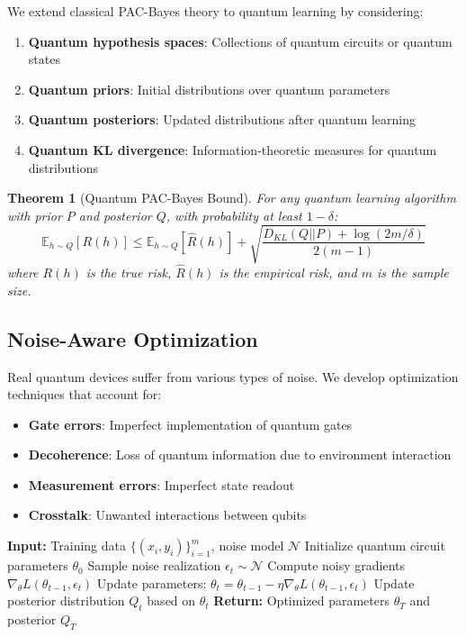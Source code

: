 \documentclass{article}
\newtheorem{theorem}{Theorem}
\begin{document}
We extend classical PAC-Bayes theory to quantum learning by considering:

\begin{enumerate}
\item \textbf{Quantum hypothesis spaces}: Collections of quantum circuits or quantum states
\item \textbf{Quantum priors}: Initial distributions over quantum parameters
\item \textbf{Quantum posteriors}: Updated distributions after quantum learning
\item \textbf{Quantum KL divergence}: Information-theoretic measures for quantum distributions
\end{enumerate}

\begin{theorem}[Quantum PAC-Bayes Bound]
For any quantum learning algorithm with prior $P$ and posterior $Q$, with probability at least $1-\delta$:
\begin{equation}
\mathbb{E}_{h \sim Q}[R(h)] \leq \mathbb{E}_{h \sim Q}[\hat{R}(h)] + \sqrt{\frac{D_{KL}(Q||P) + \log(2m/\delta)}{2(m-1)}}
\end{equation}
where $R(h)$ is the true risk, $\hat{R}(h)$ is the empirical risk, and $m$ is the sample size.
\end{theorem}

\subsection{Noise-Aware Optimization}

Real quantum devices suffer from various types of noise. We develop optimization techniques that account for:

\begin{itemize}
\item \textbf{Gate errors}: Imperfect implementation of quantum gates
\item \textbf{Decoherence}: Loss of quantum information due to environment interaction
\item \textbf{Measurement errors}: Imperfect state readout
\item \textbf{Crosstalk}: Unwanted interactions between qubits
\end{itemize}

\begin{algorithm}
\caption{Noise-Aware Quantum Optimization}
\begin{algorithmic}[1]
\State \textbf{Input:} Training data $\{(x_i, y_i)\}_{i=1}^m$, noise model $\mathcal{N}$
\State Initialize quantum circuit parameters $\theta_0$
    \State Sample noise realization $\epsilon_t \sim \mathcal{N}$
    \State Compute noisy gradients $\nabla_\theta L(\theta_{t-1}, \epsilon_t)$
    \State Update parameters: $\theta_t = \theta_{t-1} - \eta \nabla_\theta L(\theta_{t-1}, \epsilon_t)$
    \State Update posterior distribution $Q_t$ based on $\theta_t$
\EndFor
\State \textbf{Return:} Optimized parameters $\theta_T$ and posterior $Q_T$
\end{algorithmic}
\end{algorithm}
\end{document}
